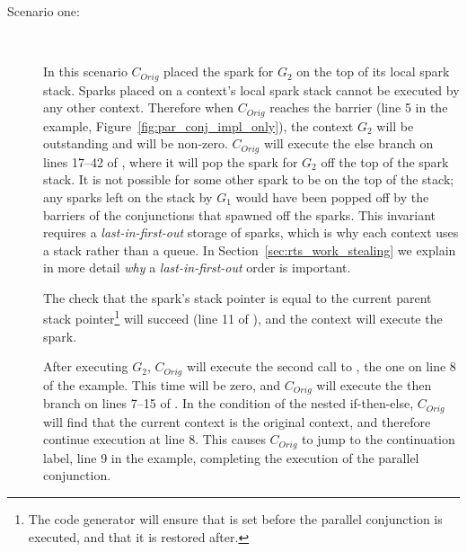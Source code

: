 \begin{description}

    \item[Scenario one:]~

    In this scenario $C_{Orig}$ placed the spark for $G_2$ on the top of its
    local spark stack.
    Sparks placed on a context's local spark stack cannot be executed by any
    other context.
    Therefore when $C_{Orig}$ reaches the \joinandcontinue barrier
    (line 5 in the example, Figure~\ref{fig:par_conj_impl_only}),
    the context $G_2$ will be outstanding and
     will be non-zero.
    $C_{Orig}$ will execute the else branch on lines 17--42 of
    \joinandcontinue,
    where it will pop the spark for $G_2$ off the top of the spark stack.
    It is not possible for some other spark to be on the top of the stack;
    any sparks left on the stack by $G_1$ would have been popped off by
    the \joinandcontinue barriers of the conjunctions that spawned off the
    sparks.
    This invariant requires a \emph{last-in-first-out} storage of sparks,
    which is why each context uses a stack rather than a queue.
    In Section~\ref{sec:rts_work_stealing} we explain in more detail
    \emph{why} a \emph{last-in-first-out} order is important.

    The check that the spark's stack pointer is equal to the current
    parent stack pointer\footnote{
        The code generator will ensure that  is set
        before the parallel conjunction is executed,
        and that it is restored after.}
    will succeed (line 11 of \joinandcontinue),
    and the context will execute the spark.

    After executing $G_2$,
    $C_{Orig}$ will execute the second call to \joinandcontinue,
    the one on line 8 of the example.
    This time  will be zero,
    and $C_{Orig}$ will execute the then branch on lines 7--15 of
    \joinandcontinue.
    In the condition of the nested if-then-else,
    $C_{Orig}$ will find that the current context is the original context,
    and therefore continue execution at line 8.
    This causes $C_{Orig}$ to jump to the continuation label,
    line 9 in the example,
    completing the execution of the parallel conjunction.


\end{description}
